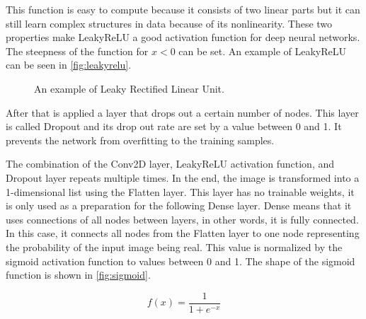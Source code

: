 \noindent This function is easy to compute because it consists of two linear parts but it can still learn complex structures in data because of its nonlinearity. These two properties make LeakyReLU a good activation function for deep neural networks. The steepness of the function for $x < 0$ can be set. An example of LeakyReLU can be seen in \autoref{fig:leakyrelu}.

\begin{figure}[!h]
    \centering
    \caption{\label{fig:leakyrelu}An example of Leaky Rectified Linear Unit.}
\end{figure}

After that is applied a layer that drops out a certain number of nodes. This layer is called Dropout and its drop out rate are set by a value between 0 and 1. It prevents the network from overfitting to the training samples.

The combination of the Conv2D layer, LeakyReLU activation function, and Dropout layer repeats multiple times. In the end, the image is transformed into a 1-dimensional list using the Flatten layer. This layer has no trainable weights, it is only used as a preparation for the following Dense layer. Dense means that it uses connections of all nodes between layers, in other words, it is fully connected. In this case, it connects all nodes from the Flatten layer to one node representing the probability of the input image being real. This value is normalized by the sigmoid activation function to values between 0 and 1. The shape of the sigmoid function is shown in \autoref{fig:sigmoid}.

$$ f(x) = \frac{1}{1 + e^{-x}} $$

